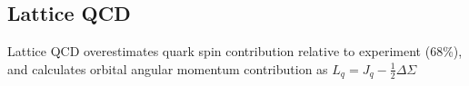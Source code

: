 \subsection{Lattice QCD}

Lattice QCD overestimates quark spin contribution relative to experiment (68\%), and calculates orbital angular momentum contribution as $L_q = J_q - \frac{1}{2}\Delta \Sigma$